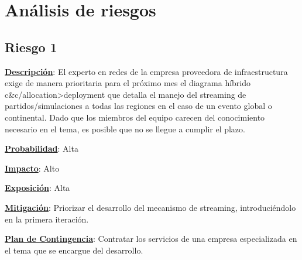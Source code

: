 \section{Análisis de riesgos}
\label{sec:riesgos}
\subsection*{Riesgo 1}
\textbf{\underline{Descripción}}: El experto en redes de la empresa proveedora de infraestructura exige de manera prioritaria para el próximo mes el diagrama híbrido  c\&c/allocation>deployment
que detalla el manejo del streaming de partidos/simulaciones a todas las regiones en el caso de un evento global o continental. Dado que los miembros del equipo carecen del conocimiento necesario en el tema, es posible que no se llegue a cumplir el plazo.

\textbf{\underline{Probabilidad}}: Alta

\textbf{\underline{Impacto}}: Alto

\textbf{\underline{Exposición}}: Alta

\textbf{\underline{Mitigación}}: Priorizar el desarrollo del mecanismo de streaming, introduciéndolo en la primera iteración.

\textbf{\underline{Plan de Contingencia}}: Contratar los servicios de una empresa especializada en el tema
que se encargue del desarrollo.








